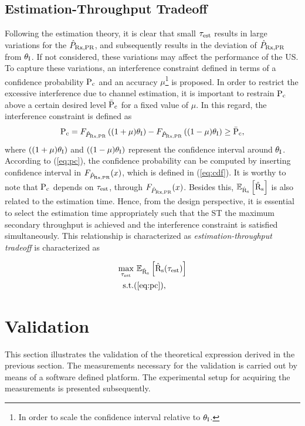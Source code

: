 \subsection{Estimation-Throughput Tradeoff}
Following the estimation theory, it is clear that small $\tau_{\text{est}}$ results in large variations for the $\hat{P}_{\text{Rx,PR}}$, and subsequently results in the deviation of $\hat{P}_{\text{Rx,PR}}$ from $\theta_{\text{I}}$. If not considered, these variations may affect the performance of the US. To capture these variations, an interference constraint defined in terms of a confidence probability $\text{P}_{\text{c}}$ and an accuracy $\mu$\footnote{In order to scale the confidence interval relative to $\theta_{\text{I}}$.} is proposed. In order to restrict the excessive interference due to channel estimation, it is important to restrain $\text{P}_{\text{c}}$ above a certain desired level $\bar{\text{P}}_{\text{c}}$ for a fixed value of $\mu$. In this regard, the interference constraint is defined as
\begin{align}
\text{P}_{\text{c}} = F_{\hat{P}_{\text{Rx,PR}}} \left( {(1 + \mu) \theta_{\text{I}}}\right)  - F_{\hat{P}_{\text{Rx,PR}}} \left({(1 - \mu) \theta_{\text{I}}} \right) \ge \bar{\text{P}}_{\text{c}}, \label{eq:pc} 
\end{align}
where $\left( {(1 + \mu) \theta_{\text{I}}}\right)$ and $\left({(1 - \mu) \theta_{\text{I}}} \right)$ represent the confidence interval around $\theta_{\text{I}}$. According to (\ref{eq:pc}), the confidence probability can be computed by inserting confidence interval in $F_{\hat{P}_{\text{Rx,PR}}}(x)$, which is defined in (\ref{eq:cdf}). It is worthy to note that $\text{P}_{\text{c}}$ depends on $\tau_{\text{est}}$, through $F_{\hat{P}_{\text{Rx,PR}}}(x)$. Besides this, ${\mathbb E}_{\hat{\text{{R}}}_{\text{s}}}\left[ \hat{\text{{R}}}_{\text{s}} \right]$ is also related to the estimation time. Hence, from the design perspective, it is essential to select the estimation time appropriately such that the ST the maximum secondary throughput is achieved and the interference constraint is satisfied simultaneously. This relationship is characterized as \textit{estimation-throughput tradeoff} is characterized as 

\begin{align}
\operatorname*{max}_{\tau_{\text{est}}}  & \text{      } {\mathbb E}_{\hat{\text{{R}}}_{\text{s}}}\left[ \hat{\text{{R}}}_{\text{s}}(\tau_{\text{est}}) \right] 
 \label{eq:sys} \\
\text{s.t.} & (\ref{eq:pc}), \nonumber  
\end{align}



\section{Validation}
\label{ssec:val}
This section illustrates the validation of the theoretical expression derived in the previous section. The measurements necessary for the validation is carried out by means of a software defined platform. The experimental setup for acquiring the measurements is presented subsequently. 
 
